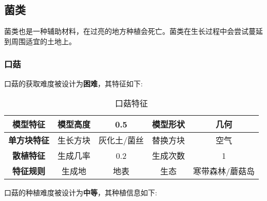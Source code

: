 \subsection{菌类}

菌类也是一种辅助材料，在过亮的地方种植会死亡。菌类在生长过程中会尝试蔓延到周围适宜的土地上。

\subsubsection{口菇}

口菇的获取难度被设计为\textbf{困难}，其特征如下:
\begin{table}[H]
    \centering
    \caption{口菇特征}
    \label{table:口菇特征}
    \setlength{\tabcolsep}{4mm}
    \begin{tabular}{c|cc|cc}
        \toprule
        \textbf{模型特征}   & 模型高度 & 0.5      & 模型形状 & 几何     \\
        \midrule
        \textbf{单方块特征} & 生长方块 & 灰化土/菌丝 & 替换方块 & 空气     \\
        \midrule
        \textbf{散植特征}   & 生成几率 & 0.2   & 生成次数 & 1        \\
        \midrule
        \textbf{特征规则}   & 生成地   & 地表   & 生态     & 寒带森林/蘑菇岛 \\
        \bottomrule
    \end{tabular}
\end{table}


口菇的种植难度被设计为\textbf{中等}，其种植信息如下:

